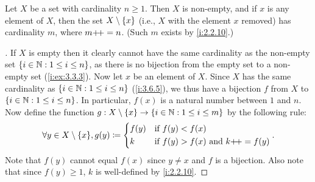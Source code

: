 \begin{lem}\label{i:3.6.9}
  Let \(X\) be a set with cardinality \(n \geq 1\).
  Then \(X\) is non-empty, and if \(x\) is any element of \(X\), then the set \(X \setminus \left\lbrace x\right\rbrace\) (i.e., \(X\) with the element \(x\) removed) has cardinality \(m\), where \(m{+}\!{+} = n\).
  (Such \(m\) exists by \cref{i:2.2.10}.)
\end{lem}

\begin{proof}[]
  If \(X\) is empty then it clearly cannot have the same cardinality as the non-empty set \(\left\lbrace i \in \mathbb{N} : 1 \leq i \leq n\right\rbrace\), as there is no bijection from the empty set to a non-empty set (\cref{i:ex:3.3.3}).
  Now let \(x\) be an element of \(X\).
  Since \(X\) has the same cardinality as \(\left\lbrace i \in \mathbb{N} : 1 \leq i \leq n\right\rbrace\) (\cref{i:3.6.5}), we thus have a bijection \(f\) from \(X\) to \(\left\lbrace i \in \mathbb{N} : 1 \leq i \leq n\right\rbrace\).
  In particular, \(f(x)\) is a natural number between \(1\) and \(n\).
  Now define the function \(g : X \setminus \left\lbrace x\right\rbrace \to \left\lbrace i \in \mathbb{N} : 1 \leq i \leq m\right\rbrace\) by the following rule:
  \[
    \forall y \in X \setminus \set{x}, g(y) \coloneqq \begin{dcases}
      f(y) & \text{if } f(y) < f(x)                          \\
      k    & \text{if } f(y) > f(x) \text{ and } k\pp = f(y)
    \end{dcases}.
  \]
  Note that \(f(y)\) cannot equal \(f(x)\) since \(y \neq x\) and \(f\) is a bijection.
  Also note that since \(f(y) \geq 1\), \(k\) is well-defined by \cref{i:2.2.10}.


\end{proof}

